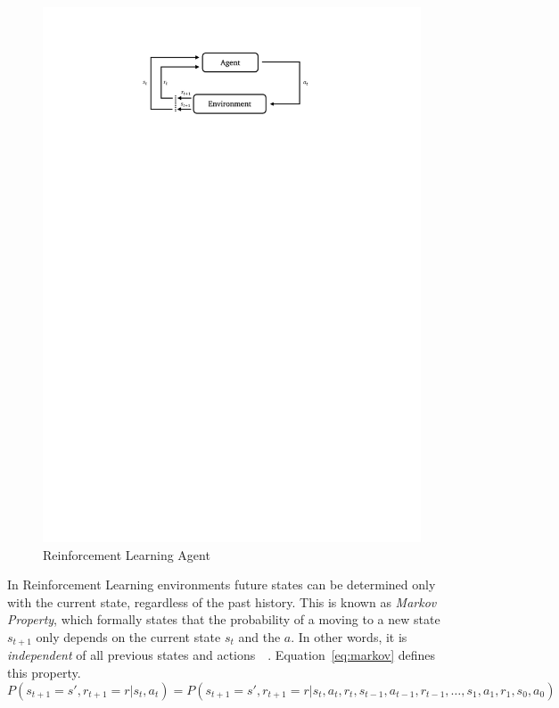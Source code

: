 \begin{figure}[ht]
    \centering
    \includegraphics[clip,trim=4cm 23.5cm 4cm 2.5cm]{RL.pdf}
    \caption{Reinforcement Learning Agent}
    \label{fig:rl}
\end{figure}

In Reinforcement Learning environments future states can be determined only with the current state, regardless of the past history. This is known as \emph{Markov Property}, which formally states that the probability of a moving to a new state $s_{t+1}$ only depends on the current state $s_t$ and the $a$. In other words, it is \emph{independent} of all previous states and actions~\cite{rlIntro}~\cite{Lorido-Botran2014}. Equation~\ref{eq:markov} defines this property.
\begin{equation}
P(s_{t+1} = s',r_{t+1} = r | s_t,a_t) = P(s_{t+1} = s',r_{t+1} = r | s_t,a_t,r_t,s_{t-1},a_{t-1},r_{t-1},\dots,s_1,a_1,r_1,s_0,a_0)
\label{eq:markov}
\end{equation}

